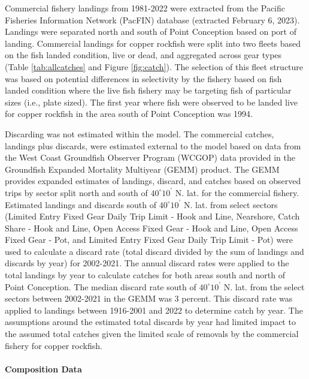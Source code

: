 \documentclass[11pt,
  english,
  letterpaper,
]{article}
\begin{document}
Commercial fishery landings from 1981-2022 were extracted from the Pacific Fisheries Information Network (PacFIN) database (extracted February 6, 2023). Landings were separated north and south of Point Conception based on port of landing. Commercial landings for copper rockfish were split into two fleets based on the fish landed condition, live or dead, and aggregated across gear types (Table \ref{tab:allcatches} and Figure \ref{fig:catch}). The selection of this fleet structure was based on potential differences in selectivity by the fishery based on fish landed condition where the live fish fishery may be targeting fish of particular sizes (i.e., plate sized). The first year where fish were observed to be landed live for copper rockfish in the area south of Point Conception was 1994.

Discarding was not estimated within the model. The commercial catches, landings plus discards, were estimated external to the model based on data from the West Coast Groundfish Observer Program (WCGOP) data provided in the Groundfish Expanded Mortality Multiyear (GEMM) product. The GEMM provides expanded estimates of landings, discard, and catches based on observed trips by sector split north and south of $40^\circ 10^\prime$ N. lat. for the commercial fishery. Estimated landings and discards south of $40^\circ 10^\prime$ N. lat. from select sectors (Limited Entry Fixed Gear Daily Trip Limit - Hook and Line, Nearshore, Catch Share - Hook and Line, Open Access Fixed Gear - Hook and Line, Open Access Fixed Gear - Pot, and Limited Entry Fixed Gear Daily Trip Limit - Pot) were used to calculate a discard rate (total discard divided by the sum of landings and discards by year) for 2002-2021. The annual discard rates were applied to the total landings by year to calculate catches for both areas south and north of Point Conception. The median discard rate south of $40^\circ 10^\prime$ N. lat. from the select sectors between 2002-2021 in the GEMM was 3 percent. This discard rate was applied to landings between 1916-2001 and 2022 to determine catch by year. The assumptions around the estimated total discards by year had limited impact to the assumed total catches given the limited scale of removals by the commercial fishery for copper rockfish.

\hypertarget{composition-data}{%
\paragraph{Composition Data}\label{composition-data}}
\end{document}
